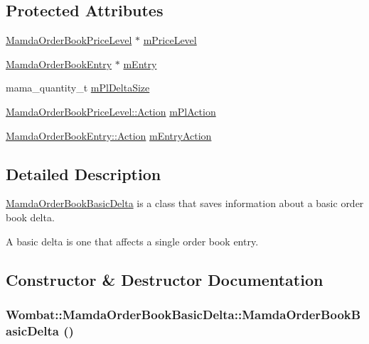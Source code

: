 \subsection*{Protected Attributes}
\begin{CompactItemize}
\item 
\hyperlink{classWombat_1_1MamdaOrderBookPriceLevel}{Mamda\-Order\-Book\-Price\-Level} $\ast$ \hyperlink{classWombat_1_1MamdaOrderBookBasicDelta_abd82c385997d03c79df774d690699f4}{m\-Price\-Level}
\item 
\hyperlink{classWombat_1_1MamdaOrderBookEntry}{Mamda\-Order\-Book\-Entry} $\ast$ \hyperlink{classWombat_1_1MamdaOrderBookBasicDelta_6c98a2021f67c632baa255236b20f288}{m\-Entry}
\item 
mama\_\-quantity\_\-t \hyperlink{classWombat_1_1MamdaOrderBookBasicDelta_a82abf62a468b5d0a66ada05af24a88f}{m\-Pl\-Delta\-Size}
\item 
\hyperlink{classWombat_1_1MamdaOrderBookPriceLevel_bd3407b4250fc6f7a42d94b6d32e358a}{Mamda\-Order\-Book\-Price\-Level::Action} \hyperlink{classWombat_1_1MamdaOrderBookBasicDelta_39972009cf7a450a5b897d4def106eb0}{m\-Pl\-Action}
\item 
\hyperlink{classWombat_1_1MamdaOrderBookEntry_fc6cb1d67c7601d093a36f59cf9bcef4}{Mamda\-Order\-Book\-Entry::Action} \hyperlink{classWombat_1_1MamdaOrderBookBasicDelta_dc1c0ab3dca14e09b1de5d931da4cf59}{m\-Entry\-Action}
\end{CompactItemize}


\subsection{Detailed Description}
\hyperlink{classWombat_1_1MamdaOrderBookBasicDelta}{Mamda\-Order\-Book\-Basic\-Delta} is a class that saves information about a basic order book delta. 

A basic delta is one that affects a single order book entry. 



\subsection{Constructor \& Destructor Documentation}
\hypertarget{classWombat_1_1MamdaOrderBookBasicDelta_1df71590f9c90f9b53c4e7873ee2ddfe}{
\subsubsection[MamdaOrderBookBasicDelta]{\setlength{\rightskip}{0pt plus 5cm}Wombat::Mamda\-Order\-Book\-Basic\-Delta::Mamda\-Order\-Book\-Basic\-Delta ()}}
\label{classWombat_1_1MamdaOrderBookBasicDelta_1df71590f9c90f9b53c4e7873ee2ddfe}


